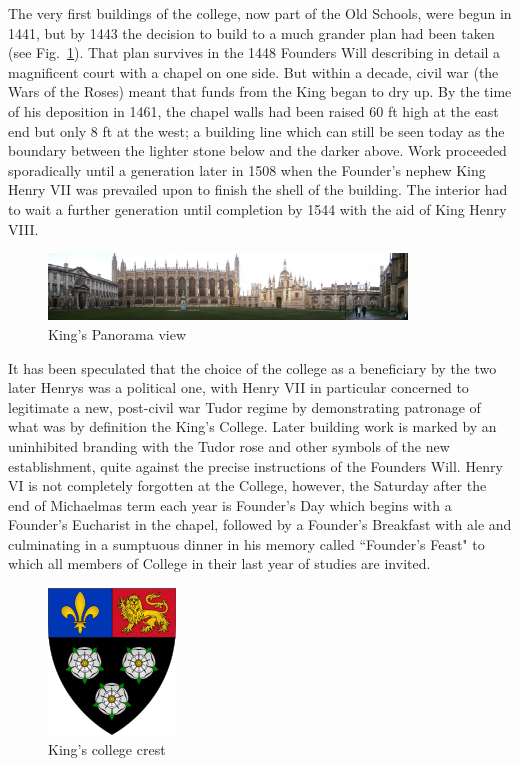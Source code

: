 \documentclass{report}
\begin{document}
\vspace{10pt}
The very first buildings of the college, now part of the Old Schools, were begun in 1441, but by 1443 the decision to build to a much grander plan had been taken (see Fig.~\ref{fig:pan}). That plan survives in the 1448 Founders Will describing in detail a magnificent court with a chapel on one side. But within a decade, civil war (the Wars of the Roses) meant that funds from the King began to dry up. By the time of his deposition in 1461, the chapel walls had been raised 60 ft high at the east end but only 8 ft at the west; a building line which can still be seen today as the boundary between the lighter stone below and the darker above. Work proceeded sporadically until a generation later in 1508 when the Founder's nephew King Henry VII was prevailed upon to finish the shell of the building. The interior had to wait a further generation until completion by 1544 with the aid of King Henry VIII.

\begin{figure}[!]
\centering
\includegraphics[width=0.85\textwidth]{Pictures/Panorama.jpg}
\caption{King's Panorama view}
\label{fig:pan}
\end{figure}

It has been speculated that the choice of the college as a beneficiary by the two later Henrys was a political one, with Henry VII in particular concerned to legitimate a new, post-civil war Tudor regime by demonstrating patronage of what was by definition the King's College. Later building work is marked by an uninhibited branding with the Tudor rose and other symbols of the new establishment, quite against the precise instructions of the Founders Will. Henry VI is not completely forgotten at the College, however, the Saturday after the end of Michaelmas term each year is Founder's Day which begins with a Founder's Eucharist in the chapel, followed by a Founder's Breakfast with ale and culminating in a sumptuous dinner in his memory called ``Founder's Feast" to which all members of College in their last year of studies are invited.

\begin{figure}
\centering
\includegraphics[scale=0.85]{Pictures/crest.png}
\caption{King's college crest}
\label{fig:crest}
\end{figure}
\end{document}
